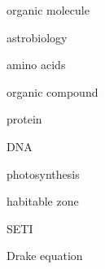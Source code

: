 \documentclass{article}
\begin{document}
\gls{organic molecule}

\gls{astrobiology}

\gls{amino acids}

\gls{organic compound}

\gls{protein}

\gls{DNA}

\gls{photosynthesis}

\gls{habitable zone}

\gls{SETI}

\gls{Drake equation}


\clearpage

\printglossaries
\end{document}
